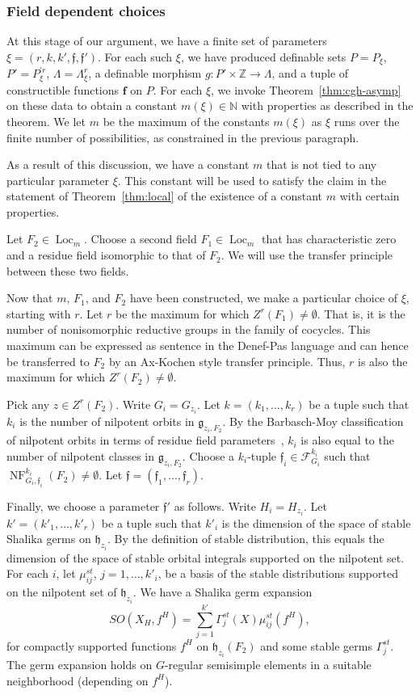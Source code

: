 \documentclass[12pt]{amsart}
\newcommand{\op}[1]{\operatorname{#1}}
\newcommand{\ring}[1]{{\mathbb #1}}
\def\NF{\op{NF}}
\def\s{{\mathfrak{f}}}
\def\bf{\mathbf f}
\newcommand{\cF}{\mathcal{F}}
\newcommand{\fg}{\mathfrak{g}}
\newcommand{\fh}{\mathfrak{h}}
\theoremstyle{plain}
\theoremstyle{definition}
\begin{document}
\subsubsection{Field dependent choices}

At this stage of our argument, we have a finite set of  parameters
$\xi=(r,k,k',\s,\s')$.  For each such $\xi$, we have produced definable sets
$P=P_\xi$, $P'=P^{'r}_\xi$, $\Lambda=\Lambda^r_\xi$, a definable
morphism $g:P'\times\ring{Z}\to \Lambda$, and a tuple of constructible
functions $\bf$ on $P$.  For each $\xi$, we invoke
Theorem~\ref{thm:cgh-asymp} on these data to obtain a constant
$m(\xi)\in\ring{N}$ with properties as described in the theorem.  We
let $m$ be the maximum of the constants $m(\xi)$ as $\xi$ runs over
the finite number of possibilities, as constrained in the previous
paragraph.

As a result of this discussion, we have a constant $m$ that is not
tied to any particular parameter $\xi$.  This constant will be used to
satisfy the claim in the statement of Theorem~\ref{thm:local} of the
existence of a constant $m$ with certain properties.

Let $F_2\in\op{Loc}_m$.  Choose a second field $F_1\in \op{Loc}_m$
that has characteristic zero and a residue field isomorphic to that of
$F_2$.  We will use the transfer principle between these two fields.

Now that $m$, $F_1$, and $F_2$ have been constructed, we make a
particular choice of $\xi$, starting with $r$.
Let $r$ be the maximum for which $Z^r(F_1)\ne\emptyset$.  That is, it is
the number of nonisomorphic reductive groups in the family of
cocycles.  This maximum can be expressed as sentence in the Denef-Pas
language and can hence be transferred to $F_2$ by an Ax-Kochen style
transfer principle.  Thus, $r$ is also the maximum for which
$Z^r(F_2)\ne\emptyset$.

Pick any $z\in Z^r(F_2)$.  Write $G_i=G_{z_i}$.  Let
$k=(k_1,\ldots,k_r)$ be a tuple such that $k_i$ is the number of
nilpotent orbits in $\fg_{z_i,F_2}$.  By the Barbasch-Moy
classification of nilpotent orbits in terms of residue field
parameters~\cite{barbasch-moy}, $k_i$ is also equal to the number of
nilpotent classes in $\fg_{z_i,F_2}$.  Choose a $k_i$-tuple $\s_i\in
\cF_{G_i}^{k_i}$ such that $\NF^{k_i}_{G_i,\s_i}(F_2)\ne \emptyset$.
Let $\s = (\s_1,\ldots,\s_r)$.

Finally, we choose a parameter $\s'$ as follows.
Write $H_i = H_{z_i}$.  Let $k'=(k'_1,\ldots,k'_r)$ be a tuple such
that $k'_i$ is the dimension of the space of stable Shalika germs on
$\fh_{z_i}$.  By the definition of stable distribution, this equals
the dimension of the space of stable orbital integrals supported on
the nilpotent set.  For each $i$, let $\mu_{ij}^{st}$, $j =
1,\ldots,k'_i$, be a basis of the stable distributions supported on
the nilpotent set of $\fh_{z_i}$.  We have a Shalika germ expansion
\[
SO(X_H,f^H) = \sum_{j=1}^{k'} \Gamma^{st}_j(X) \mu_{ij}^{st}(f^H),
\]
for compactly supported functions $f^H$ on $\fh_{z_i}(F_2)$ and some
stable germs $\Gamma^{st}_j$.  The germ expansion holds on $G$-regular
semisimple elements in a suitable neighborhood (depending on $f^H$).
\end{document}
